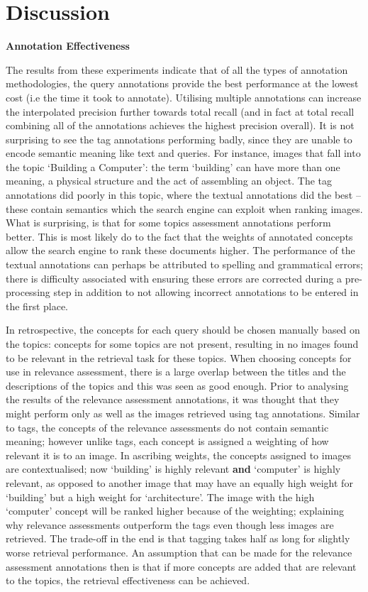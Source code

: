 \chapter{Discussion}

\textbf{Annotation Effectiveness}

The results from these experiments indicate that of all the types of annotation methodologies, the query annotations provide the best performance at the lowest cost (i.e the time it took to annotate). Utilising multiple annotations can increase the interpolated precision further towards total recall (and in fact at total recall combining all of the annotations achieves the highest precision overall). It is not surprising to see the tag annotations performing badly, since they are unable to encode semantic meaning like text and queries. For instance, images that fall into the topic `Building a Computer': the term `building' can have more than one meaning, a physical structure and the act of assembling an object. The tag annotations did poorly in this topic, where the textual annotations did the best -- these contain semantics which the search engine can exploit when ranking images.  What is surprising, is that for some topics assessment annotations perform better. This is most likely do to the fact that the weights of annotated concepts allow the search engine to rank these documents higher. The performance of the textual annotations can perhaps be attributed to spelling and grammatical errors; there is difficulty associated with ensuring these errors are corrected during a pre-processing step in addition to not allowing incorrect annotations to be entered in the first place.

In retrospective, the concepts for each query should be chosen manually based on the topics: concepts for some topics are not present, resulting in no images found to be relevant in the retrieval task for these topics. When choosing concepts for use in relevance assessment, there is a large overlap between the titles and the descriptions of the topics and this was seen as good enough. Prior to analysing the results of the relevance assessment annotations, it was thought that they might perform only as well as the images retrieved using tag annotations. Similar to tags, the concepts of the relevance assessments do not contain semantic meaning; however unlike tags, each concept is assigned a weighting of how relevant it is to an image. In ascribing weights, the concepts assigned to images are contextualised; now `building' is highly relevant \textbf{and} `computer' is highly relevant, as opposed to another image that may have an equally high weight for `building' but a high weight for `architecture'. The image with the high `computer' concept will be ranked higher because of the weighting; explaining why relevance assessments outperform the tags even though less images are retrieved. The trade-off in the end is that tagging takes half as long for slightly worse retrieval performance. An assumption that can be made for the relevance assessment annotations then is that if more concepts are added that are relevant to the topics, the retrieval effectiveness can be achieved.

